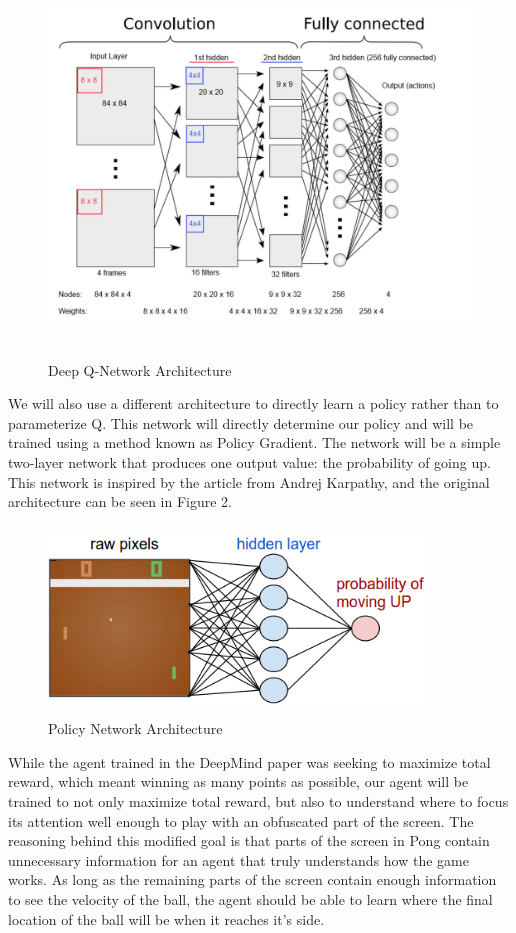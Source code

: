 \documentclass{article}
\begin{document}
\begin{figure}
  \centering
  \includegraphics[width=12cm, height=10cm]{nn_diagram}
  \caption{Deep Q-Network Architecture}
  \label{fig:deepQ}
\end{figure}

We will also use a different architecture to directly learn a policy rather than to parameterize Q. This network will directly determine our policy
and will be trained using a method known as Policy Gradient. The network will be a simple two-layer network that produces one output value:
the probability of going up. This network is inspired by the article from Andrej Karpathy, and the original architecture can be
seen in Figure 2.

\begin{figure}
  \centering
  \includegraphics[width=10cm, height=5cm]{policy}
  \caption{Policy Network Architecture} 
  \label{fig:policy}
\end{figure}

While the agent trained in the DeepMind paper was seeking to maximize total reward, which meant winning as many points as possible, our
agent will be trained to not only maximize total reward, but also to understand where to focus its attention well enough to play with an obfuscated
part of the screen. The reasoning behind this modified goal is that parts of the screen in Pong contain unnecessary information
for an agent that truly understands how the game works. As long as the remaining parts of the screen contain enough information to see the velocity of the 
ball, the agent should be able to learn where the final location of the ball will be when it reaches it's side. 
\end{document}

